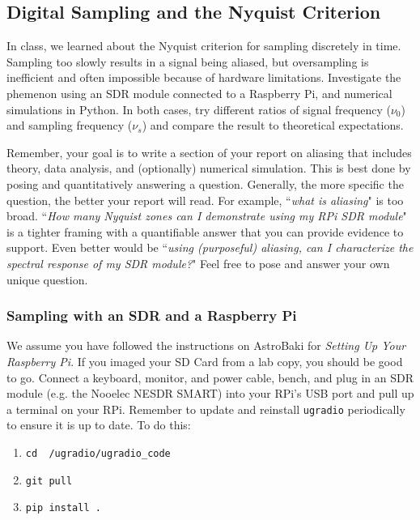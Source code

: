 \documentclass[11pt,preprint]{aastex}
\begin{document}
\subsection{Digital Sampling and the Nyquist Criterion}

\noindent
%
In class, we learned about the 
Nyquist criterion for sampling discretely in time. 
Sampling too slowly results in a signal being aliased, but oversampling
is inefficient and often impossible because of hardware limitations.
Investigate the phemenon using an SDR module connected to a 
Raspberry Pi, and numerical simulations in Python.
In both cases, try different ratios of 
signal frequency ($\nu_0$) and sampling frequency ($\nu_s$) and compare
the result to theoretical expectations.

Remember, your goal is to write a section of your report on aliasing
that includes theory, data analysis, and (optionally) numerical
simulation.
This is best done by posing and quantitatively answering a question.
Generally, the more specific the
question, the better your report will read. For example, ``{\it what
is aliasing}" is too broad. ``{\it How many Nyquist zones
can I demonstrate using my RPi SDR module}" is a tighter framing with
a quantifiable answer that you can provide evidence to support. Even better
would be ``{\it using (purposeful) aliasing, can I characterize
the spectral response of my SDR module?}"
Feel free to pose and answer your own unique question.

\subsubsection{Sampling with an SDR and a Raspberry Pi}

\noindent
We assume you have followed the instructions on AstroBaki for 
{\it Setting Up Your Raspberry Pi}.
If you imaged your SD Card from a lab copy, you should be good to go.
Connect a keyboard, monitor, and power cable,
bench, and plug in an SDR module 
(e.g. the Nooelec NESDR SMART) into your RPi's USB port and pull up a 
terminal on your RPi.
Remember to update and reinstall {\tt ugradio} periodically 
to ensure it is up to date. To do this:
\begin{enumerate}
\item {\tt cd ~/ugradio/ugradio\_code}
\item {\tt git pull}
\item {\tt pip install .}
\end{enumerate}
\end{document}
